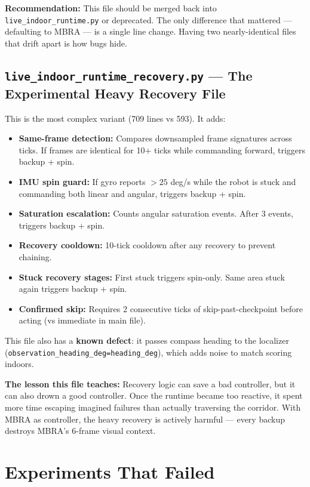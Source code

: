 \documentclass[11pt]{article}
\begin{document}
\textbf{Recommendation:} This file should be merged back into \texttt{live\_indoor\_runtime.py} or deprecated. The only difference that mattered --- defaulting to MBRA --- is a single line change. Having two nearly-identical files that drift apart is how bugs hide.

\subsection{\texttt{live\_indoor\_runtime\_recovery.py} --- The Experimental Heavy Recovery File}

This is the most complex variant (709 lines vs 593). It adds:
\begin{itemize}
\item \textbf{Same-frame detection:} Compares downsampled frame signatures across ticks. If frames are identical for 10+ ticks while commanding forward, triggers backup + spin.
\item \textbf{IMU spin guard:} If gyro reports $>25$ deg/s while the robot is stuck and commanding both linear and angular, triggers backup + spin.
\item \textbf{Saturation escalation:} Counts angular saturation events. After 3 events, triggers backup + spin.
\item \textbf{Recovery cooldown:} 10-tick cooldown after any recovery to prevent chaining.
\item \textbf{Stuck recovery stages:} First stuck triggers spin-only. Same area stuck again triggers backup + spin.
\item \textbf{Confirmed skip:} Requires 2 consecutive ticks of skip-past-checkpoint before acting (vs immediate in main file).
\end{itemize}

This file also has a \textbf{known defect}: it passes compass heading to the localizer (\texttt{observation\_heading\_deg=heading\_deg}), which adds noise to match scoring indoors.

\textbf{The lesson this file teaches:} Recovery logic can save a bad controller, but it can also drown a good controller. Once the runtime became too reactive, it spent more time escaping imagined failures than actually traversing the corridor. With MBRA as controller, the heavy recovery is actively harmful --- every backup destroys MBRA's 6-frame visual context.


\section{Experiments That Failed}
\end{document}
